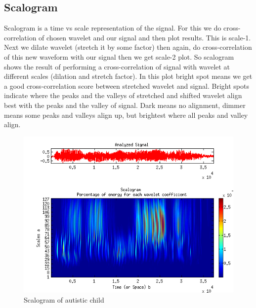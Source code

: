\documentclass[11pt]{report}
\begin{document}
\begin{enumerate}
\subsection{Scalogram}
Scalogram is a time vs scale representation of the signal. For this we do cross-correlation of chosen wavelet and our signal and then plot results. This is scale-1. Next we dilate wavelet (stretch it by some factor) then again, do cross-correlation of this new waveform with our signal then we get scale-2 plot. So scalogram \cite{sca} shows the result of performing a cross-correlation of signal with wavelet at different scales (dilation and stretch factor).
In this plot bright spot means we get a good cross-correlation score between stretched wavelet and signal. Bright spots indicate where the peaks and the valleys of stretched and shifted wavelet align best with the peaks and the valley of signal. Dark means no alignment, dimmer means some peaks and valleys align up, but brightest where all peaks and valley align.  
\begin{figure}[h]
\centering
\includegraphics[scale=.6]{./images/sca_asd.png}
\caption{Scalogram of autistic child}
\end{figure}


\end{enumerate}
\end{document}
